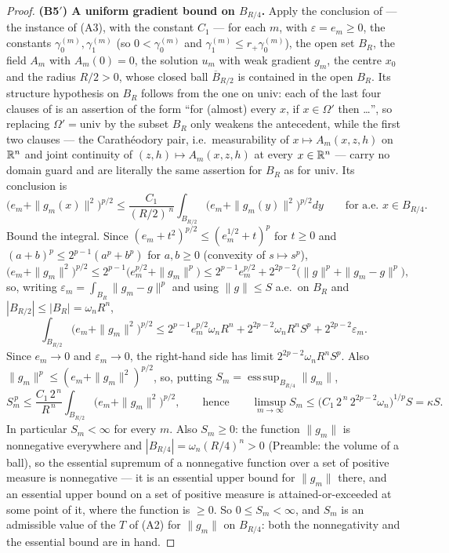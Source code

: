 \begin{proof}
\textbf{(B5$'$) A uniform gradient bound on $B_{R/4}$.}  Apply the conclusion of
 --- the instance of (A3), with the constant $C_1$
--- for each $m$, with $\varepsilon=e_m\ge0$, the constants
$\gamma_0^{(m)},\gamma_1^{(m)}$ (so $0<\gamma_0^{(m)}$ and
$\gamma_1^{(m)}\le r_+\gamma_0^{(m)}$), the open set $B_R$, the field $A_m$ with
$A_m(0)=0$, the solution $u_m$ with weak gradient $g_m$, the centre $x_0$ and
the radius $R/2>0$, whose closed ball $\overline B_{R/2}$ is contained in the
open $B_R$.  Its structure hypothesis on $B_R$ follows from the one on
$\mathrm{univ}$: each of the last four clauses of
 is an assertion of the form ``for (almost) every
$x$, if $x\in\Omega'$ then \dots'', so replacing $\Omega'=\mathrm{univ}$ by the
subset $B_R$ only weakens the antecedent, while the first two clauses --- the
Carath\'eodory pair, i.e.\ measurability of $x\mapsto A_m(x,z,h)$ on $\mathbb{R}^n$ and
joint continuity of $(z,h)\mapsto A_m(x,z,h)$ at every $x\in\mathbb{R}^n$ --- carry no
domain guard and are literally the same assertion for $B_R$ as for
$\mathrm{univ}$.  Its conclusion is
\[
\bigl(e_m+\|g_m(x)\|^2\bigr)^{p/2}
\le\frac{C_1}{(R/2)^{\,n}}\int_{B_{R/2}}\bigl(e_m+\|g_m(y)\|^2\bigr)^{p/2}dy
\qquad\text{for a.e. }x\in B_{R/4}.
\]
Bound the integral.  Since $(e_m+t^2)^{p/2}\le(e_m^{1/2}+t)^{p}$ for $t\ge0$ and
$(a+b)^p\le2^{p-1}(a^p+b^p)$ for $a,b\ge0$ (convexity of $s\mapsto s^p$),
\[
\bigl(e_m+\|g_m\|^2\bigr)^{p/2}\le2^{p-1}\bigl(e_m^{p/2}+\|g_m\|^{p}\bigr)
\le2^{p-1}e_m^{p/2}+2^{2p-2}\bigl(\|g\|^{p}+\|g_m-g\|^{p}\bigr),
\]
so, writing $\varepsilon_m=\int_{B_R}\|g_m-g\|^p$ and using $\|g\|\le S$ a.e.\
on $B_R$ and $|B_{R/2}|\le|B_R|=\omega_nR^n$,
\[
\int_{B_{R/2}}\bigl(e_m+\|g_m\|^2\bigr)^{p/2}
\le2^{p-1}e_m^{p/2}\omega_nR^n+2^{2p-2}\omega_nR^nS^p+2^{2p-2}\varepsilon_m .
\]
Since $e_m\to0$ and $\varepsilon_m\to0$, the right-hand side has limit
$2^{2p-2}\omega_nR^nS^p$.  Also $\|g_m\|^p\le(e_m+\|g_m\|^2)^{p/2}$, so, putting
$S_m=\operatorname{ess\,sup}_{B_{R/4}}\|g_m\|$,
\[
S_m^{\,p}\le\frac{C_1\,2^{\,n}}{R^{\,n}}\int_{B_{R/2}}\bigl(e_m+\|g_m\|^2\bigr)^{p/2},
\qquad\text{hence}\qquad
\limsup_{m\to\infty}S_m\le\bigl(C_1\,2^{\,n}\,2^{2p-2}\omega_n\bigr)^{1/p}S=\kappa S .
\]
In particular $S_m<\infty$ for every $m$.  Also $S_m\ge0$: the function
$\|g_m\|$ is nonnegative everywhere and $|B_{R/4}|=\omega_n(R/4)^n>0$
(Preamble: the volume of a ball), so the essential supremum of a nonnegative
function over a set of positive measure is nonnegative --- it is an essential
upper bound for $\|g_m\|$ there, and an essential upper bound on a set of
positive measure is attained-or-exceeded at some point of it, where the function
is $\ge0$.  So $0\le S_m<\infty$, and $S_m$ is an admissible value of
the $T$ of (A2) for $\|g_m\|$ on $B_{R/4}$: both the
nonnegativity and the essential bound are in hand.


\end{proof}

